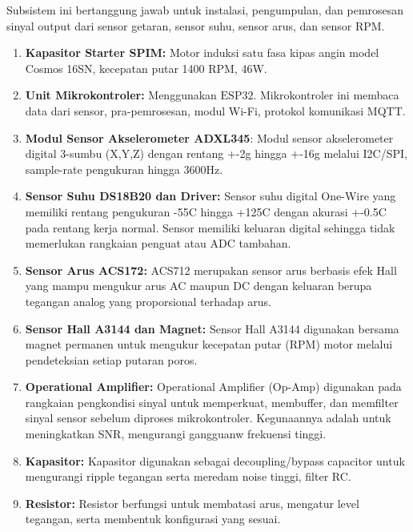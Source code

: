 \documentclass{elsinta}
\begin{document}
Subsistem ini bertanggung jawab untuk instalasi, pengumpulan, dan pemrosesan sinyal output dari sensor getaran, sensor suhu, sensor arus, dan sensor RPM.
\begin{enumerate}
    \item \textbf{Kapasitor Starter SPIM:} Motor induksi satu fasa kipas angin model Cosmos 16SN, kecepatan putar 1400 RPM, 46W.
    \item \textbf{Unit Mikrokontroler:} Menggunakan $\text{ESP32}$. Mikrokontroler ini membaca data dari sensor, pra-pemrosesan, modul Wi-Fi, protokol komunikasi MQTT.
    \item \textbf{Modul Sensor Akselerometer ADXL345}: Modul sensor akselerometer digital 3-sumbu (X,Y,Z) dengan rentang +-2g hingga +-16g melalui I2C/SPI, sample-rate pengukuran hingga 3600Hz.
    \item \textbf{Sensor Suhu DS18B20 dan Driver:} Sensor suhu digital One-Wire yang memiliki rentang pengukuran -55C hingga +125C dengan akurasi +-0.5C pada rentang kerja normal. Sensor memiliki keluaran digital sehingga tidak memerlukan rangkaian penguat atau ADC tambahan.
    \item \textbf{Sensor Arus ACS172:} ACS712 merupakan sensor arus berbasis efek Hall yang mampu mengukur arus AC maupun DC dengan keluaran berupa tegangan analog yang proporsional terhadap arus.
    \item \textbf{Sensor Hall A3144 dan Magnet:} Sensor Hall A3144 digunakan bersama magnet permanen untuk mengukur kecepatan putar (RPM) motor melalui pendeteksian setiap putaran poros.
    \item \textbf{Operational Amplifier:} Operational Amplifier (Op-Amp) digunakan pada rangkaian pengkondisi sinyal untuk memperkuat, membuffer, dan memfilter sinyal sensor sebelum diproses mikrokontroler. Kegunaannya adalah untuk meningkatkan SNR, mengurangi gangguanw frekuensi tinggi.
    \item \textbf{Kapasitor:} Kapasitor digunakan sebagai decoupling/bypass capacitor untuk mengurangi ripple tegangan serta meredam noise tinggi, filter RC.
    \item \textbf{Resistor:} Resistor berfungsi untuk membatasi arus, mengatur level tegangan, serta membentuk konfigurasi yang sesuai.
\end{enumerate}

\end{document}
